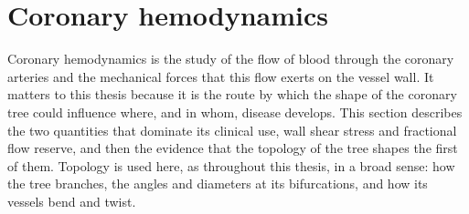 %
%
%
%
%

\section{Coronary hemodynamics}
\label{sec:hemodynamics}

Coronary hemodynamics is the study of the flow of blood through the coronary arteries and the
mechanical forces that this flow exerts on the vessel wall.
It matters to this thesis because it is the route by which the shape of the coronary tree could
influence where, and in whom, disease develops.
This section describes the two quantities that dominate its clinical use, wall shear stress and
fractional flow reserve, and then the evidence that the topology of the tree shapes the first of
them.
Topology is used here, as throughout this thesis, in a broad sense: how the tree branches, the
angles and diameters at its bifurcations, and how its vessels bend and twist.

